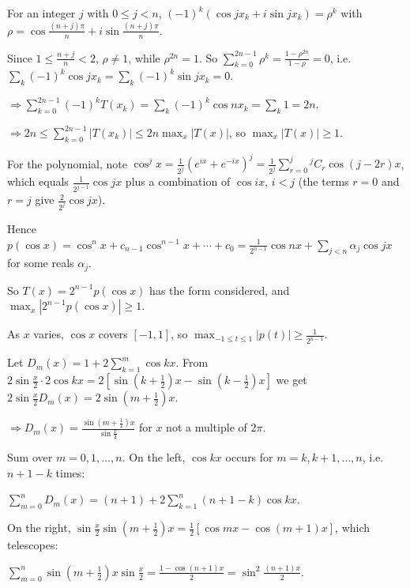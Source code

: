   For an integer $j$ with $0\leq j < n$, $(-1)^k(\cos jx_k + i\sin jx_k) = \rho^k$ with $\rho = \cos\frac{(n
    + j)\pi}{n} + i\sin\frac{(n + j)\pi}{n}$.

  Since $1\leq\frac{n + j}{n} < 2$, $\rho\neq 1$, while $\rho^{2n} = 1$. So $\displaystyle\sum_{k = 0}^{2n -
    1}\rho^k = \frac{1 - \rho^{2n}}{1 - \rho} = 0$, i.e.\ $\displaystyle\sum_k(-1)^k\cos jx_k
  = \sum_k(-1)^k\sin jx_k = 0$.

  $\Rightarrow\displaystyle\sum_{k = 0}^{2n - 1}(-1)^kT(x_k) = \sum_k(-1)^k\cos nx_k = \sum_k 1 = 2n$.

  $\Rightarrow 2n\leq\displaystyle\sum_{k = 0}^{2n - 1}|T(x_k)|\leq 2n\max_x|T(x)|$, so $\displaystyle\max_x|T(x)|\geq 1$.

  For the polynomial, note $\cos^jx = \frac{1}{2^j}\left(e^{ix} + e^{-ix}\right)^j = \frac{1}{2^j}\displaystyle\sum_{r =
    0}^j{}^jC_r\cos(j - 2r)x$, which equals $\frac{1}{2^{j - 1}}\cos jx$ plus a combination of $\cos ix$,
  $i < j$ (the terms $r = 0$ and $r = j$ give $\frac{2}{2^j}\cos jx$).

  Hence $p(\cos x) = \cos^nx + c_{n - 1}\cos^{n - 1}x + \cdots + c_0 = \frac{1}{2^{n - 1}}\cos nx +
  \displaystyle\sum_{j < n}\alpha_j\cos jx$ for some reals $\alpha_j$.

  So $T(x) = 2^{n - 1}p(\cos x)$ has the form considered, and $\displaystyle\max_x|2^{n - 1}p(\cos x)|\geq
  1$.

  As $x$ varies, $\cos x$ covers $[-1, 1]$, so $\displaystyle\max_{-1\leq t\leq 1}|p(t)|\geq\frac{1}{2^{n -
      1}}$.
\item Let $D_m(x) = 1 + 2\displaystyle\sum_{k = 1}^m\cos kx$. From $2\sin\frac{x}{2}\cdot 2\cos kx = 2\left[\sin\left(k
    + \frac{1}{2}\right)x - \sin\left(k - \frac{1}{2}\right)x\right]$ we get $2\sin\frac{x}{2}D_m(x) =
  2\sin\left(m + \frac{1}{2}\right)x$.

  $\Rightarrow D_m(x) = \frac{\sin\left(m + \frac{1}{2}\right)x}{\sin\frac{x}{2}}$ for $x$ not a multiple of
  $2\pi$.

  Sum over $m = 0, 1, \ldots, n$. On the left, $\cos kx$ occurs for $m = k, k + 1, \ldots, n$, i.e.\ $n + 1 -
  k$ times:

  $\displaystyle\sum_{m = 0}^nD_m(x) = (n + 1) + 2\sum_{k = 1}^n(n + 1 - k)\cos kx$.

  On the right, $\sin\frac{x}{2}\sin\left(m + \frac{1}{2}\right)x = \frac{1}{2}[\cos mx - \cos(m + 1)x]$, which
  telescopes:

  $\displaystyle\sum_{m = 0}^n\sin\left(m + \frac{1}{2}\right)x\sin\frac{x}{2} = \frac{1 - \cos(n + 1)x}{2} =
  \sin^2\frac{(n + 1)x}{2}$.

